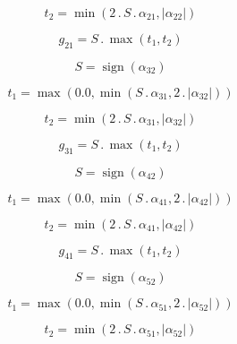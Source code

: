 \documentclass{article}
\begin{document}
\begin{dmath}t_{2} = \min\left(2 \,.\, S \,.\, \alpha_{21}, \left|{\alpha_{22}}\right|\right)\end{dmath}

\begin{dmath}g_{21} = S \,.\, \max\left(t_{1}, t_{2}\right)\end{dmath}

\begin{dmath}S = \operatorname{sign}{\left (\alpha_{32} \right )}\end{dmath}

\begin{dmath}t_{1} = \max\left(0.0, \min\left(S \,.\, \alpha_{31}, 2 \,.\, \left|{\alpha_{32}}\right|\right)\right)\end{dmath}

\begin{dmath}t_{2} = \min\left(2 \,.\, S \,.\, \alpha_{31}, \left|{\alpha_{32}}\right|\right)\end{dmath}

\begin{dmath}g_{31} = S \,.\, \max\left(t_{1}, t_{2}\right)\end{dmath}

\begin{dmath}S = \operatorname{sign}{\left (\alpha_{42} \right )}\end{dmath}

\begin{dmath}t_{1} = \max\left(0.0, \min\left(S \,.\, \alpha_{41}, 2 \,.\, \left|{\alpha_{42}}\right|\right)\right)\end{dmath}

\begin{dmath}t_{2} = \min\left(2 \,.\, S \,.\, \alpha_{41}, \left|{\alpha_{42}}\right|\right)\end{dmath}

\begin{dmath}g_{41} = S \,.\, \max\left(t_{1}, t_{2}\right)\end{dmath}

\begin{dmath}S = \operatorname{sign}{\left (\alpha_{52} \right )}\end{dmath}

\begin{dmath}t_{1} = \max\left(0.0, \min\left(S \,.\, \alpha_{51}, 2 \,.\, \left|{\alpha_{52}}\right|\right)\right)\end{dmath}

\begin{dmath}t_{2} = \min\left(2 \,.\, S \,.\, \alpha_{51}, \left|{\alpha_{52}}\right|\right)\end{dmath}
\end{document}
